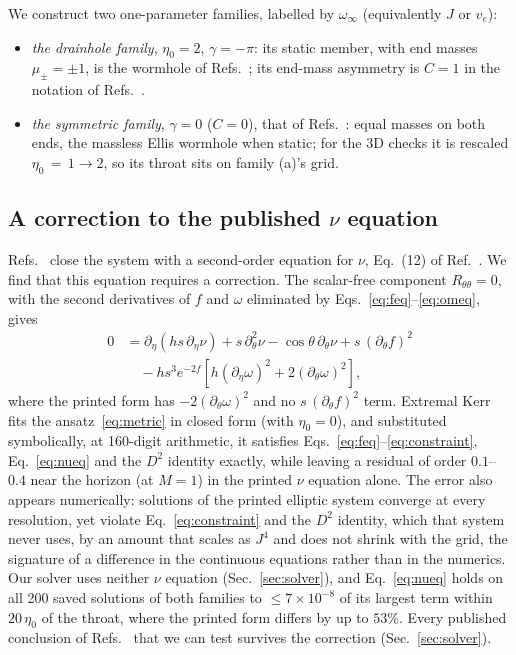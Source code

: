 \documentclass[twocolumn,floatfix,aps,prd,superscriptaddress,nofootinbib]{revtex4-2}
\begin{document}
We construct two one-parameter families, labelled by $\omega_\infty$ (equivalently $J$ or $v_e$):
\begin{itemize}
\item[(a)] \emph{the drainhole family}, $\eta_0=2$, $\gamma=-\pi$: its static member, with end masses $\mu_\pm=\pm1$, is the wormhole of Refs.~\cite{shirokov2026,shirokov2026c}; its end-mass asymmetry is $C=1$ in the notation of Refs.~\cite{azad2023,azad2024}.
\item[(b)] \emph{the symmetric family}, $\gamma=0$ ($C=0$), that of Refs.~\cite{kleihaus_kunz2014,chew2016}: equal masses on both ends, the massless Ellis wormhole when static; for the 3D checks it is rescaled $\eta_0\,{=}\,1\to2$, so its throat sits on family (a)'s grid.
\end{itemize}

\subsection{A correction to the published $\nu$ equation}
\label{sec:model:eq12}

Refs.~\cite{kleihaus_kunz2014,chew2016} close the system with a second-order equation for $\nu$, Eq.~(12) of Ref.~\cite{chew2016}. We find that this equation requires a correction. The scalar-free component $R_{\theta\theta}=0$, with the second derivatives of $f$ and $\omega$ eliminated by Eqs.~\eqref{eq:feq}--\eqref{eq:omeq}, gives
\begin{equation}
\begin{split}
0&=\partial_\eta\!\left(h s\,\partial_\eta\nu\right)+s\,\partial_\theta^2\nu-\cos\theta\,\partial_\theta\nu+s\,(\partial_\theta f)^2\\
&\quad-h s^3 e^{-2f}\left[h(\partial_\eta\omega)^2+2(\partial_\theta\omega)^2\right],
\end{split}
\label{eq:nueq}
\end{equation}
where the printed form has $-2(\partial_\theta\omega)^2$ and no $s\,(\partial_\theta f)^2$ term. Extremal Kerr fits the ansatz~\eqref{eq:metric} in closed form (with $\eta_0=0$), and substituted symbolically, at 160-digit arithmetic, it satisfies Eqs.~\eqref{eq:feq}--\eqref{eq:constraint}, Eq.~\eqref{eq:nueq} and the $D^2$ identity exactly, while leaving a residual of order $0.1$--$0.4$ near the horizon (at $M=1$) in the printed $\nu$ equation alone. The error also appears numerically: solutions of the printed elliptic system converge at every resolution, yet violate Eq.~\eqref{eq:constraint} and the $D^2$ identity, which that system never uses, by an amount that scales as $J^4$ and does not shrink with the grid, the signature of a difference in the continuous equations rather than in the numerics. Our solver uses neither $\nu$ equation (Sec.~\ref{sec:solver}), and Eq.~\eqref{eq:nueq} holds on all 200 saved solutions of both families to $\le7\times10^{-8}$ of its largest term within $20\,\eta_0$ of the throat, where the printed form differs by up to $53\%$. Every published conclusion of Refs.~\cite{kleihaus_kunz2014,chew2016} that we can test survives the correction (Sec.~\ref{sec:solver}).
\end{document}
